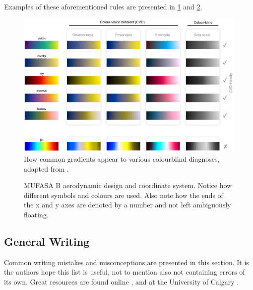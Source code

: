 \noindent
Examples of these aforementioned rules are presented in \cref{fig:gradientExample} and \ref{fig:dataExample}. 


\begin{figure}[hbt!]
	\centering
	\captionsetup{width=\textwidth}
	\includegraphics[width=\textwidth]{Photos/Figures/gradients.png}
	\caption{How common gradients appear to various colourblind diagnoses, adapted from \citeauthor{colourScienceMisuse} \cite{colourScienceMisuse}.}
	\label{fig:gradientExample}
	\hfill
\end{figure}



\begin{figure}[hbt!]
	\centering
	\captionsetup{width=0.5\textwidth}
	\def\svgwidth{0.55\textwidth}
	
	\caption{MUFASA B aerodynamic design and coordinate system. Notice how different symbols and colours are used. Also note how the ends of the x and y axes are denoted by a number and not left ambiguously floating.}
	\label{fig:dataExample}
	\hfill
\end{figure}


\subsection{General Writing}

Common writing mistakes and misconceptions are presented in this section. It is the authors hope this list is useful, not to mention also not containing errors of its own. 
Great resources are found online \cite{writingAIAA}, and at the University of Calgary \cite{writingUofC,writingCoursesUofC}. 


